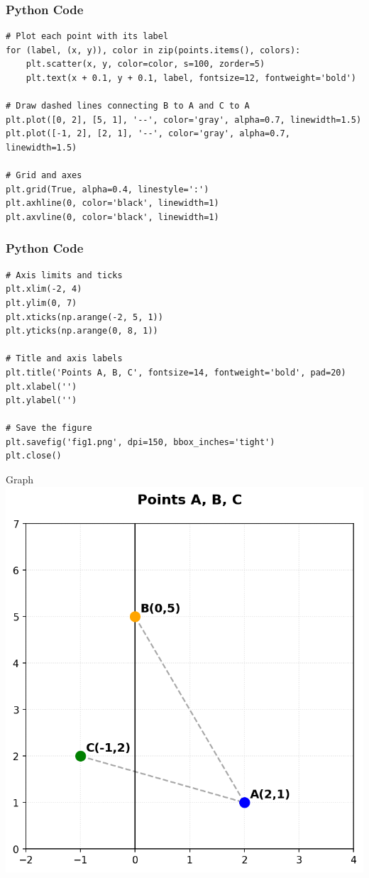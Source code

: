 \documentclass{beamer}
\begin{document}
\begin{frame}[fragile]
    \frametitle{Python Code}
    \begin{lstlisting}
# Plot each point with its label
for (label, (x, y)), color in zip(points.items(), colors):
    plt.scatter(x, y, color=color, s=100, zorder=5)
    plt.text(x + 0.1, y + 0.1, label, fontsize=12, fontweight='bold')

# Draw dashed lines connecting B to A and C to A
plt.plot([0, 2], [5, 1], '--', color='gray', alpha=0.7, linewidth=1.5)
plt.plot([-1, 2], [2, 1], '--', color='gray', alpha=0.7, linewidth=1.5)

# Grid and axes
plt.grid(True, alpha=0.4, linestyle=':')
plt.axhline(0, color='black', linewidth=1)
plt.axvline(0, color='black', linewidth=1)
    \end{lstlisting}
\end{frame}

\begin{frame}[fragile]
    \frametitle{Python Code}
    \begin{lstlisting}
# Axis limits and ticks
plt.xlim(-2, 4)
plt.ylim(0, 7)
plt.xticks(np.arange(-2, 5, 1))
plt.yticks(np.arange(0, 8, 1))

# Title and axis labels
plt.title('Points A, B, C', fontsize=14, fontweight='bold', pad=20)
plt.xlabel('')
plt.ylabel('')

# Save the figure
plt.savefig('fig1.png', dpi=150, bbox_inches='tight')
plt.close()
    \end{lstlisting}
\end{frame}

\begin{frame}{Graph}
   \centering
    \includegraphics[width=\columnwidth, height=0.8\textheight, keepaspectratio]{figs/fig1.png}
    \label{fig:Beamer/figs/fig1.png}
\end{frame}
\end{document}
